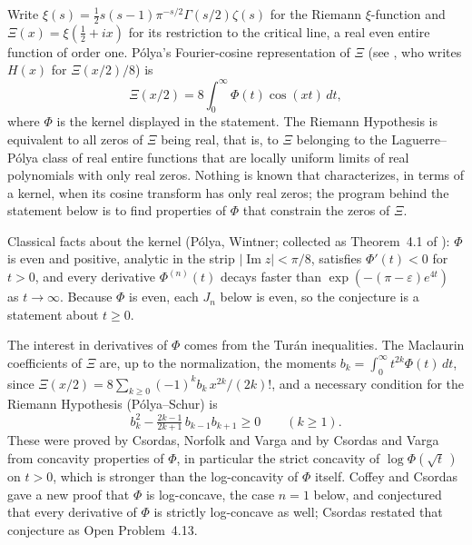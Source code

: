 

\begin{cxcredits}
\end{cxcredits}

\begin{cxcontext}
Write $\xi(s)=\tfrac12 s(s-1)\pi^{-s/2}\Gamma(s/2)\zeta(s)$ for the Riemann $\xi$-function and $\Xi(x)=\xi(\tfrac12+ix)$ for its restriction to the critical line, a real even entire function of order one. Pólya's Fourier-cosine representation of $\Xi$ (see \citealp[\S4]{Csordas2014}, who writes $H(x)$ for $\Xi(x/2)/8$) is
\[
\Xi(x/2)=8\int_0^\infty \Phi(t)\cos(xt)\,dt,
\]
where $\Phi$ is the kernel displayed in the statement. The Riemann Hypothesis is equivalent to all zeros of $\Xi$ being real, that is, to $\Xi$ belonging to the Laguerre--P\'olya class of real entire functions that are locally uniform limits of real polynomials with only real zeros. Nothing is known that characterizes, in terms of a kernel, when its cosine transform has only real zeros; the program behind the statement below is to find properties of $\Phi$ that constrain the zeros of $\Xi$.

Classical facts about the kernel (P\'olya, Wintner; collected as Theorem~4.1 of \citealp{Csordas2014}): $\Phi$ is even and positive, analytic in the strip $|\operatorname{Im}z|<\pi/8$, satisfies $\Phi'(t)<0$ for $t>0$, and every derivative $\Phi^{(n)}(t)$ decays faster than $\exp(-(\pi-\varepsilon)e^{4t})$ as $t\to\infty$. Because $\Phi$ is even, each $J_n$ below is even, so the conjecture is a statement about $t\ge0$.

The interest in derivatives of $\Phi$ comes from the Tur\'an inequalities. The Maclaurin coefficients of $\Xi$ are, up to the normalization, the moments $b_k=\int_0^\infty t^{2k}\Phi(t)\,dt$, since $\Xi(x/2)=8\sum_{k\ge0}(-1)^k b_k\,x^{2k}/(2k)!$, and a necessary condition for the Riemann Hypothesis (P\'olya--Schur) is
\[
b_k^2-\tfrac{2k-1}{2k+1}\,b_{k-1}b_{k+1}\ge0\qquad(k\ge1).
\]
These were proved by Csordas, Norfolk and Varga \citeyearpar{CsordasNorfolkVarga1986} and by Csordas and Varga \citeyearpar{CsordasVarga1988} from concavity properties of $\Phi$, in particular the strict concavity of $\log\Phi(\sqrt t\,)$ on $t>0$, which is stronger than the log-concavity of $\Phi$ itself. Coffey and Csordas \citeyearpar{coffey2013log} gave a new proof that $\Phi$ is log-concave, the case $n=1$ below, and conjectured that every derivative of $\Phi$ is strictly log-concave as well; Csordas restated that conjecture as Open Problem~4.13.


\end{cxcontext}
